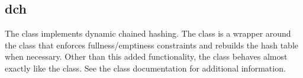 %
%
%
%
%              

\subsection{dch}
\label{dch}

The  class implements dynamic chained hashing.  The
 class is a wrapper around the  class that enforces
fullness/emptiness constraints and rebuilds the hash table when necessary.
Other than this added functionality, the  class behaves almost
exactly like the  class.  See the 
class documentation for additional information.

